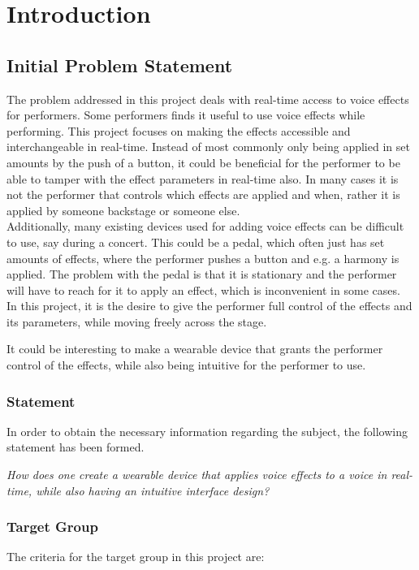 \chapter{Introduction}\label{ch:Intro}

\section{Initial Problem Statement}

The problem addressed in this project deals with real-time access to voice effects for performers. 
Some performers finds it useful to use voice effects while performing. This project focuses on making the effects accessible and interchangeable in real-time. Instead of most commonly only being applied in set amounts by the push of a button, it could be beneficial for the performer to be able to tamper with the effect parameters in real-time also. In many cases it is not the performer that controls which effects are applied and when, rather it is applied by someone backstage or someone else. \\

Additionally, many existing devices used for adding voice effects can be difficult to use, say during a concert. This could be a pedal, which often just has set amounts of effects, where the performer pushes a button and e.g. a harmony is applied. The problem with the pedal is that it is stationary and the performer will have to reach for it to apply an effect, which is inconvenient in some cases.\\

In this project, it is the desire to give the performer full control of the effects and its parameters, while moving freely across the stage.

It could be interesting to make a wearable device that grants the performer control of the effects, while also being intuitive for the performer to use.


\subsection{Statement}
In order to obtain the necessary information regarding the subject, the following statement has been formed.

\textit{How does one create a wearable device that applies voice effects to a voice in real-time, while also having an intuitive interface design?}


\subsection{Target Group}
The criteria for the target group in this project are:

